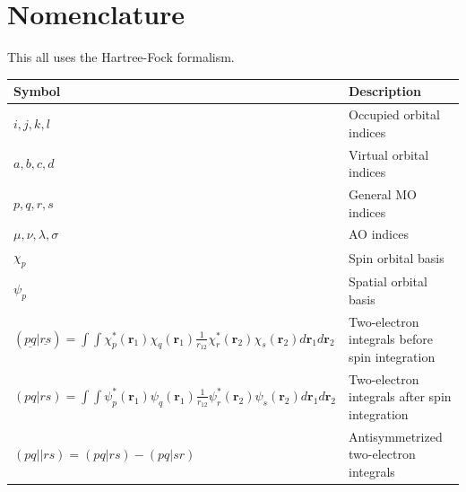 \documentclass[12pt]{caltech_thesis}
\begin{document}
\tableofcontents
\listoffigures
\listoftables
\printnomenclature

\mainmatter

\chapter{Nomenclature}
This all uses the Hartree-Fock formalism.\\
\begin{tabular}{p{} p{}}
Symbol & Description \\
\hline
\(i,j,k,l\) & Occupied orbital indices \\
\(a,b,c,d\) & Virtual orbital indices \\
\(p,q,r,s\) & General MO indices \\
\(\mu,\nu,\lambda,\sigma\) & AO indices \\
\(\chi_p\) & Spin orbital basis \\
\(\psi_p\) & Spatial orbital basis \\
\((\underline{pq}|\underline{rs}) = \int \int \chi_p^*(\mathbf{r}_1)\chi_q(\mathbf{r}_1)\frac{1}{r_{12}}\chi_r^*(\mathbf{r}_2)\chi_s(\mathbf{r}_2)d\mathbf{r}_1d\mathbf{r}_2\) & Two-electron integrals before spin integration\\
\((pq|rs) = \int \int \psi_p^*(\mathbf{r}_1)\psi_q(\mathbf{r}_1)\frac{1}{r_{12}}\psi_r^*(\mathbf{r}_2)\psi_s(\mathbf{r}_2)d\mathbf{r}_1d\mathbf{r}_2\) & Two-electron integrals after spin integration\\
\((pq||rs) = (pq|rs) - (pq|sr)\) & Antisymmetrized two-electron integrals \\

\end{tabular}
\end{document}
